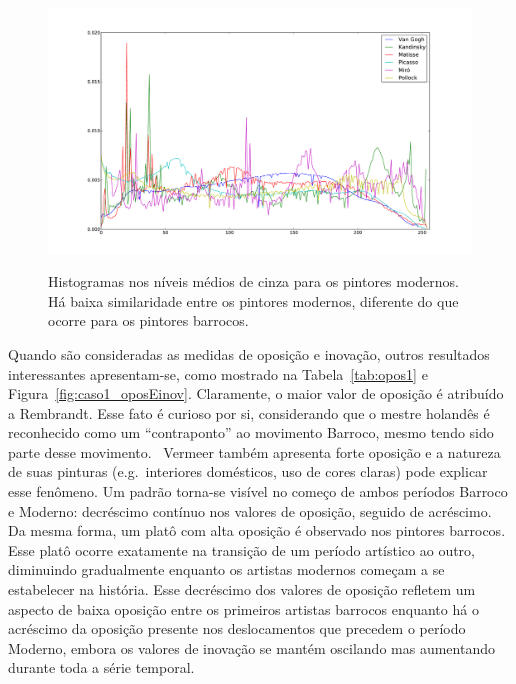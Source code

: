 \begin{figure}[h!]
    
\begin{center}
{    \centering
        \includegraphics[width=\columnwidth]{figs/chiaroscuro_modernos}}
      \caption{Histogramas nos níveis médios de cinza para os pintores
        modernos. Há baixa similaridade entre os pintores modernos, diferente do
        que ocorre para os pintores barrocos.}
        \label{fig:chiaroscuro_modernos}
  \end{center}
\end{figure}

Quando são consideradas as medidas de oposição e inovação, outros
resultados interessantes apresentam-se, como mostrado na
Tabela~\ref{tab:opos1} e Figura~\ref{fig:caso1_oposEinov}. Claramente,
o maior valor de oposição é atribuído a Rembrandt. Esse fato é curioso
por si, considerando que o mestre holandês é reconhecido como um
``contraponto'' ao movimento Barroco, mesmo tendo sido parte desse
movimento.~\cite{gombrich} Vermeer também apresenta forte oposição e a
natureza de suas pinturas (e.g.\ interiores domésticos, uso de cores
claras) pode explicar esse fenômeno. Um padrão torna-se visível no
começo de ambos períodos Barroco e Moderno: decréscimo contínuo nos
valores de oposição, seguido de acréscimo. Da mesma forma, um platô
com alta oposição é observado nos pintores barrocos. Esse platô ocorre
exatamente na transição de um período artístico ao outro, diminuindo
gradualmente enquanto os artistas modernos começam a se estabelecer na
história. Esse decréscimo dos valores de oposição refletem um aspecto
de baixa oposição entre os primeiros artistas barrocos enquanto há o
acréscimo da oposição presente nos deslocamentos que precedem o
período Moderno, embora os valores de inovação se mantém oscilando mas
aumentando durante toda a série temporal.

